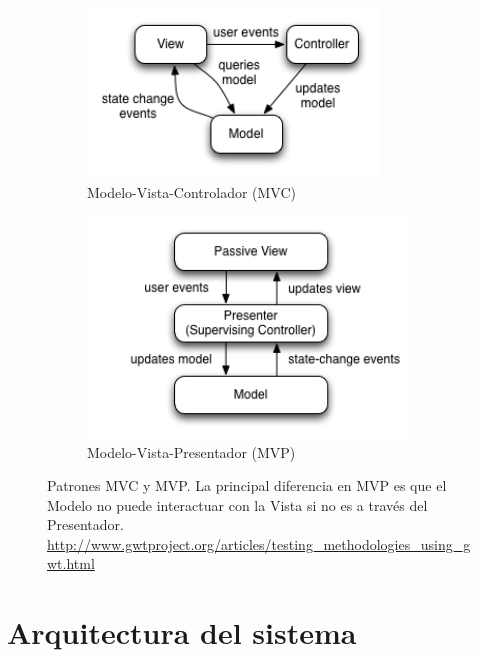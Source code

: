 \begin{figure}[htbp]\centering
\begin{subfigure}[b]{0.49\textwidth}\centering
\includegraphics[width=0.85\textwidth]{MVC}
\caption{Modelo-Vista-Controlador (MVC)}
\end{subfigure}
\begin{subfigure}[b]{0.49\textwidth}\centering
\includegraphics[width=0.94\textwidth]{MVP}
\caption{Modelo-Vista-Presentador (MVP)}
\end{subfigure}
\caption[Patrones MVC y MVP]{Patrones MVC y MVP. La principal diferencia en MVP es que el Modelo no puede interactuar con la Vista si no es a través del Presentador. \\
{\footnotesize \url{http://www.gwtproject.org/articles/testing_methodologies_using_gwt.html}}}
\label{fig:MVP-MVC}
\end{figure}

\section{Arquitectura del sistema}

